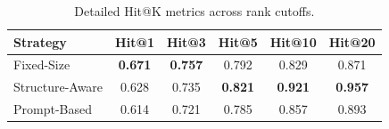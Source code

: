 \begin{table}[h]
    \centering
    \footnotesize
    \setlength{\tabcolsep}{3.5pt}
    \begin{tabular}{lccccc}
        \toprule
        \textbf{Strategy} & \textbf{Hit@1} & \textbf{Hit@3} & \textbf{Hit@5} & \textbf{Hit@10} & \textbf{Hit@20} \\
        \midrule
        Fixed-Size      & \textbf{0.671} & \textbf{0.757} & 0.792 & 0.829 & 0.871 \\
        Structure-Aware & 0.628          & 0.735          & \textbf{0.821} & \textbf{0.921} & \textbf{0.957} \\
        Prompt-Based    & 0.614          & 0.721          & 0.785 & 0.857 & 0.893 \\
        \bottomrule
    \end{tabular}
    \caption{Detailed Hit@K metrics across rank cutoffs.}
    \label{tab:detailed_hits}
\end{table}
